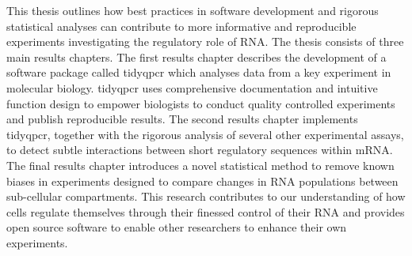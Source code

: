 \documentclass[../main.tex]{subfiles}
\begin{document}
This thesis outlines how best practices in software development and rigorous statistical analyses can contribute to more informative and reproducible experiments investigating the regulatory role of RNA.
The thesis consists of three main results chapters.
The first results chapter describes the development of a software package called tidyqpcr which analyses data from a key experiment in molecular biology.
tidyqpcr uses comprehensive documentation and intuitive function design to empower biologists to conduct quality controlled experiments and publish reproducible results.
The second results chapter implements tidyqpcr, together with the rigorous analysis of several other experimental assays, to detect subtle interactions between short regulatory sequences within mRNA.
The final results chapter introduces a novel statistical method to remove known biases in experiments designed to compare changes in RNA populations between sub-cellular compartments.
This research contributes to our understanding of how cells regulate themselves through their finessed control of their RNA and provides open source software to enable other researchers to enhance their own experiments.
\end{document}
